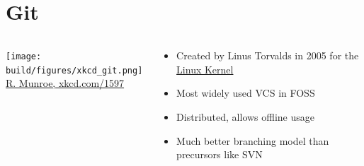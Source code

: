 
\section{Git}
\begin{frame}[c]
    \begin{columns}[onlytextwidth, c]%
      \begin{column}{0.3\textwidth}%
        \texttt{[image: build/figures/xkcd\_git.png]}\\%
        \small \href{https://xkcd.com/1597/}{R. Munroe, xkcd.com/1597}
      \end{column}%
      \hfill%
      \begin{column}{0.695\textwidth}%
        \begin{itemize}
          \item Created by Linus Torvalds in 2005 for the \href{https://github.com/torvalds/linux}{Linux Kernel}
          \item Most widely used VCS in FOSS
          \item Distributed, allows offline usage
          \item Much better branching model than precursors like SVN
        \end{itemize}
      \end{column}%
    \end{columns}%
\end{frame}

